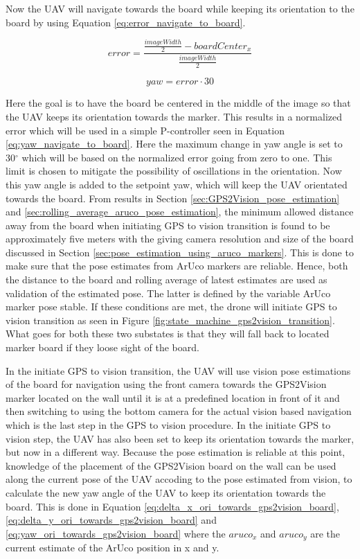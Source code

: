 \documentclass[../Head/report.tex]{subfiles}
\begin{document}
Now the UAV will navigate towards the board while keeping its orientation to the board by using Equation \ref{eq:error_navigate_to_board}. 

\begin{equation}
	error = \frac{\frac{imageWidth}{2} - boardCenter_x}{\frac{imageWidth}{2}}
\label{eq:error_navigate_to_board}
\end{equation}    

\begin{equation}
	yaw = error \cdot 30
\label{eq:yaw_navigate_to_board}
\end{equation} 

Here the goal is to have the board be centered in the middle of the image so that the UAV keeps its orientation towards the marker. This results in a normalized error which will be used in a simple P-controller seen in Equation \ref{eq:yaw_navigate_to_board}. Here the maximum change in yaw angle is set to 30$^{\circ}$ which will be based on the normalized error going from zero to one. This limit is chosen to mitigate the possibility of oscillations in the orientation. Now this yaw angle is added to the setpoint yaw, which will keep the UAV orientated towards the board. From results in Section \ref{sec:GPS2Vision_pose_estimation} and \ref{sec:rolling_average_aruco_pose_estimation}, the minimum allowed distance away from the board when initiating GPS to vision transition is found to be approximately five meters with the giving camera resolution and size of the board discussed in Section \ref{sec:pose_estimation_using_aruco_markers}. This is done to make sure that the pose estimates from ArUco markers are reliable. Hence, both the distance to the board and rolling average of latest estimates are used as validation of the estimated pose. The latter is defined by the variable ArUco marker pose stable. If these conditions are met, the drone will initiate GPS to vision transition as seen in Figure \ref{fig:state_machine_gps2vision_transition}.  What goes for both these two substates is that they will fall back to located marker board if they loose sight of the board. 

In the initiate GPS to vision transition, the UAV will use vision pose estimations of the board for navigation using the front camera towards the GPS2Vision marker located on the wall until it is at a predefined location in front of it and then switching to using the bottom camera for the actual vision based navigation which is the last step in the GPS to vision procedure. In the initiate GPS to vision step, the UAV has also been set to keep its orientation towards the marker, but now in a different way. Because the pose estimation is reliable at this point, knowledge of the placement of the GPS2Vision board on the wall can be used along the current pose of the UAV accoding to the pose estimated from vision, to calculate the new yaw angle of the UAV to keep its orientation towards the board. This is done in Equation \ref{eq:delta_x_ori_towards_gps2vision_board}, \ref{eq:delta_y_ori_towards_gps2vision_board} and \ref{eq:yaw_ori_towards_gps2vision_board} where the $aruco_x$ and $aruco_y$ are the current estimate of the ArUco position in x and y. 
\end{document}
